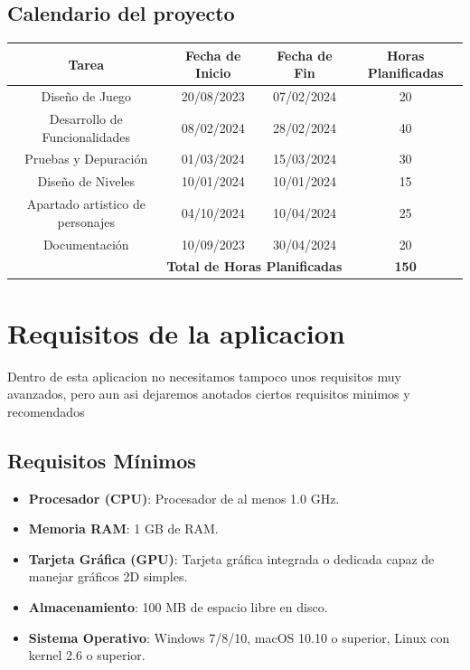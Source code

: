 \documentclass[a4paper]{article}
\begin{document}
    \subsection{Calendario del proyecto}
    \begin{table}[ht]
        \centering
        \begin{tabular}{|c|c|c|c|}
        \hline
        \textbf{Tarea} & \textbf{Fecha de Inicio} & \textbf{Fecha de Fin} & \textbf{Horas Planificadas} \\
        \hline
        Diseño de Juego & 20/08/2023 & 07/02/2024 & 20 \\
        \hline
        Desarrollo de Funcionalidades & 08/02/2024 & 28/02/2024 & 40 \\
        \hline
        Pruebas y Depuración & 01/03/2024 & 15/03/2024 & 30 \\
        \hline
        Diseño de Niveles & 10/01/2024 & 10/01/2024 & 15 \\
        \hline
        Apartado artistico de personajes & 04/10/2024 & 10/04/2024 & 25 \\
        \hline
        Documentación & 10/09/2023 & 30/04/2024 & 20 \\
        \hline
        \multicolumn{3}{|r|}{\textbf{Total de Horas Planificadas}} & \textbf{150} \\
        \hline
        \end{tabular}
        \label{tab:planificacion-horas}
    \end{table}

    
    \clearpage
    \section{Requisitos de la aplicacion}
    Dentro de esta aplicacion no necesitamos tampoco unos requisitos muy avanzados, pero aun asi dejaremos anotados ciertos requisitos minimos y recomendados
    \subsection{Requisitos Mínimos}

\begin{itemize}
    \item \textbf{Procesador (CPU)}: Procesador de al menos 1.0 GHz.
    \item \textbf{Memoria RAM}: 1 GB de RAM.
    \item \textbf{Tarjeta Gráfica (GPU)}: Tarjeta gráfica integrada o dedicada capaz de manejar gráficos 2D simples.
    \item \textbf{Almacenamiento}: 100 MB de espacio libre en disco.
    \item \textbf{Sistema Operativo}: Windows 7/8/10, macOS 10.10 o superior, Linux con kernel 2.6 o superior.
\end{itemize}
\end{document}
